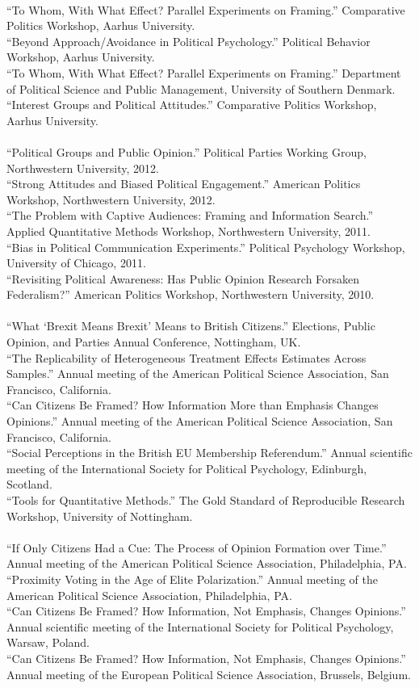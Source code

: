 \documentclass[12pt]{article}
\newcommand{\topic}[1]{\pagebreak[3]\indent {\color{lg}{\footnotesize #1 }}\\}
\newcommand{\entry}[1]{\indent {\color{lg}\guillemotright}\hspace{2pt}#1\vspace{.25em}\\}
\begin{document}
	\topic{Invited Presentations (2013)}
	\entry{``To Whom, With What Effect? Parallel Experiments on Framing.'' Comparative Politics Workshop, Aarhus University.}
	\entry{``Beyond Approach/Avoidance in Political Psychology.'' Political Behavior Workshop, Aarhus University.}
	\entry{``To Whom, With What Effect? Parallel Experiments on Framing.'' Department of Political Science and Public Management, University of Southern Denmark.}
	\entry{``Interest Groups and Political Attitudes.'' Comparative Politics Workshop, Aarhus University.}
	
	\topic{Invited Presentations (2012 and earlier)}
	\entry{``Political Groups and Public Opinion.'' Political Parties Working Group, Northwestern University, 2012.}
	\entry{``Strong Attitudes and Biased Political Engagement.'' American Politics Workshop, Northwestern University, 2012.}
	\entry{``The Problem with Captive Audiences: Framing and Information Search.'' Applied Quantitative Methods Workshop, Northwestern University, 2011.}
	\entry{``Bias in Political Communication Experiments.'' Political Psychology Workshop, University of Chicago, 2011.}
	\entry{``Revisiting Political Awareness: Has Public Opinion Research Forsaken Federalism?'' American Politics Workshop, Northwestern University, 2010.}

	\topic{Conference Papers (2017)}
    \entry{``What `Brexit Means Brexit' Means to British Citizens.'' Elections, Public Opinion, and Parties Annual Conference, Nottingham, UK.}
	\entry{``The Replicability of Heterogeneous Treatment Effects Estimates Across Samples.'' Annual meeting of the American Political Science Association, San Francisco, California.}
    \entry{``Can Citizens Be Framed? How Information More than Emphasis Changes Opinions.'' Annual meeting of the American Political Science Association, San Francisco, California.}
    \entry{``Social Perceptions in the British EU Membership Referendum.'' Annual scientific meeting of the International Society for Political Psychology, Edinburgh, Scotland.}
    \entry{``Tools for Quantitative Methods.'' The Gold Standard of Reproducible Research Workshop, University of Nottingham.}
	
    \topic{Conference Papers (2016)}
	\entry{``If Only Citizens Had a Cue: The Process of Opinion Formation over Time.'' Annual meeting of the American Political Science Association, Philadelphia, PA.}
	\entry{``Proximity Voting in the Age of Elite Polarization.'' Annual meeting of the American Political Science Association, Philadelphia, PA.}
	\entry{``Can Citizens Be Framed? How Information, Not Emphasis, Changes Opinions.'' Annual scientific meeting of the International Society for Political Psychology, Warsaw, Poland.}
	\entry{``Can Citizens Be Framed? How Information, Not Emphasis, Changes Opinions.'' Annual meeting of the European Political Science Association, Brussels, Belgium.}
	
\end{document}
